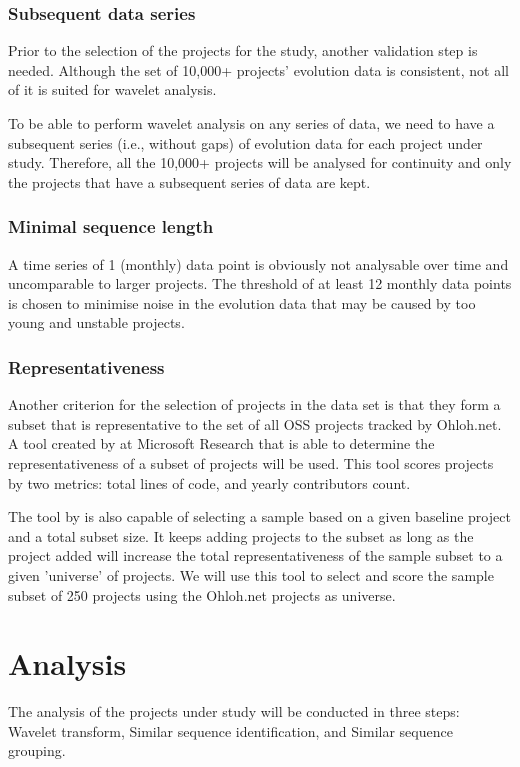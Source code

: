 \subsubsection{Subsequent data series}
Prior to the selection of the projects for the study, another validation
step is needed. Although the set of 10,000+ projects' evolution data is
consistent, not all of it is suited for wavelet analysis.

To be able to perform wavelet analysis on any series of data, we need to have
a subsequent series (i.e., without gaps) of evolution data for each project
under study. Therefore, all the 10,000+ projects will be analysed for continuity
and only the projects that have a subsequent series of data are kept.

\subsubsection{Minimal sequence length}
A time series of 1 (monthly) data point is obviously not analysable over time
and uncomparable to larger projects. The threshold of at least 12 monthly data
points is chosen to minimise noise in the evolution data that may be caused by
too young and unstable projects.

\subsubsection{Representativeness}
Another criterion for the selection of projects in the data set is that they
form a subset that is representative to the set of all OSS projects tracked by
Ohloh.net. A tool created by \citet{nagappan} at Microsoft Research that is able
to determine the representativeness of a subset of projects will be used. This
tool scores projects by two metrics: total lines of code, and yearly
contributors count.

The tool by \citet{nagappan} is also capable of selecting a sample based on a
given baseline project and a total subset size. It keeps adding projects to the
subset as long as the project added will increase the total representativeness
of the sample subset to a given 'universe' of projects. We will use this tool
to select and score the sample subset of 250 projects using the Ohloh.net
projects as universe.



\section{Analysis}
The analysis of the projects under study will be conducted in three steps:
Wavelet transform, Similar sequence identification, and Similar sequence
grouping.

